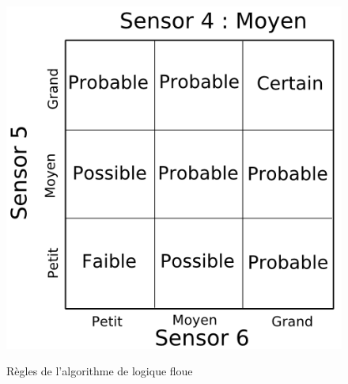 \documentclass[12pt,letterpaper]{article}
\begin{document}
\begin{figure}
{        \includegraphics[scale=0.35]{images/f_s4_moyen.png}}
    \quad

    \caption{Règles de l'algorithme de logique floue}
    \label{fig:f_rule}
\end{figure}
\end{document}

